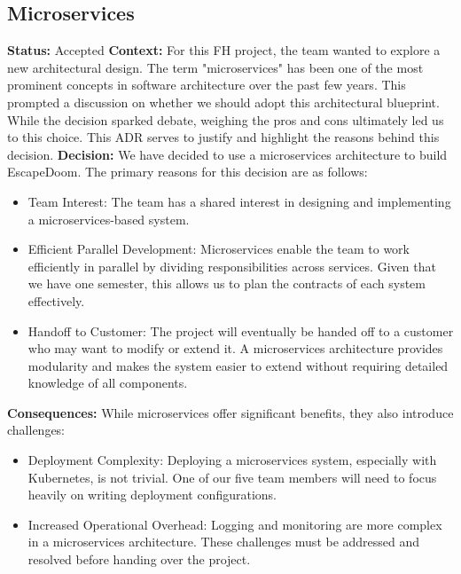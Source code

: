\subsection{Microservices}
\textbf{Status:} Accepted
\newline
\newline
\textbf{Context:}
For this FH project, the team wanted to explore a new architectural design. The term "microservices" has been one of the most prominent concepts in software architecture over the past few years. This prompted a discussion on whether we should adopt this architectural blueprint. While the decision sparked debate, weighing the pros and cons ultimately led us to this choice. This ADR serves to justify and highlight the reasons behind this decision.
\newline
\newline
\textbf{Decision:}
We have decided to use a microservices architecture to build EscapeDoom.
\newline
The primary reasons for this decision are as follows:
\begin{itemize}
    \item Team Interest: The team has a shared interest in designing and implementing a microservices-based system.
    \item Efficient Parallel Development: Microservices enable the team to work efficiently in parallel by dividing responsibilities across services. Given that we have one semester, this allows us to plan the contracts of each system effectively.
    \item Handoff to Customer: The project will eventually be handed off to a customer who may want to modify or extend it. A microservices architecture provides modularity and makes the system easier to extend without requiring detailed knowledge of all components.
\end{itemize}
\textbf{Consequences:}
\newline
\newline
While microservices offer significant benefits, they also introduce challenges:
\begin{itemize}
    \item Deployment Complexity: Deploying a microservices system, especially with Kubernetes, is not trivial. One of our five team members will need to focus heavily on writing deployment configurations.
    \item Increased Operational Overhead: Logging and monitoring are more complex in a microservices architecture. These challenges must be addressed and resolved before handing over the project.
\end{itemize}


